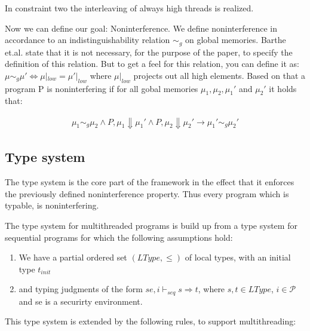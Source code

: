 \documentclass[a4paper,10pt]{llncs}
\begin{document}
In constraint two the interleaving of always high threads is realized.


Now we can define our goal: Noninterference. We define noninterference
in accordance to an indistinguishability relation $\sim_g$ on global memories.
Barthe et.al. state that it is not necessary, for the purpose of the paper,
to specify the definition of this relation. But to get a feel for this
relation, you can define it as: $\mu \sim_g \mu' \Leftrightarrow \mu|_{low} =
\mu'|_{low}$ where $\mu|_{low}$ projects out all high elements. Based on that
a program P is noninterfering if for all gobal memories $\mu_1, \mu_2, \mu_1'$
and $\mu_2'$ it holds that:

\begin{align*}
\mu_1 \sim_g \mu_2 \land P,\mu_1 \Downarrow \mu_1' \land P,\mu_2 \Downarrow \mu_2' \rightarrow \mu_1' \sim_g \mu_2'
\end{align*}

\subsection{Type system}
\label{sec:typesystem}
The type system is the core part of the framework in the effect that it
enforces the previously defined noninterference property. Thus every
program which is typable, is noninterfering.

The type system for multithreaded programs is build up from a type system
for sequential programs for which the following assumptions hold:

\begin{enumerate}
\item We have a partial ordered set $(LType, \leq)$ of local types, with an initial
      type $t_{init}$
\item and typing judgments of the form $se, i \vdash_{seq} s \Rightarrow t$, where
      $s, t \in LType$, $i \in \mathcal{P}$ and se is a securirty environment.
\end{enumerate}

This type system is extended by the following rules, to support multithreading:

\begin{prooftree}
\end{prooftree}
\end{document}
